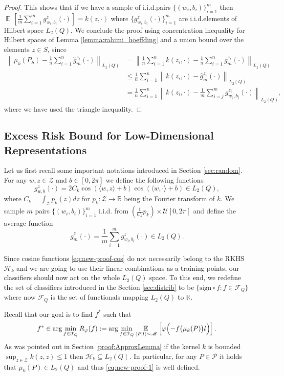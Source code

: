 \documentclass{article}
\DeclareMathOperator*{\E}{\mathbb{E}\,}
\renewcommand{\P}{\mathcal{P}}
\renewcommand{\H}{\mathcal{H}}
\newcommand{\U}{\mathcal{U}}
\newcommand{\F}{\mathcal{F}}
\newcommand{\M}{\mathscr{M}}
\newcommand{\Z}{\mathcal{Z}}
\newcommand{\sig}{\mathrm{sign}\circ\!}
\newcommand{\R}{\mathbb{R}}
\begin{document}
\begin{proof}
This shows that if we have a sample of i.i.d.\:pairs $\{(w_i,b_i)\}_{i=1}^m$
then $\E\left[\frac{1}{m}\sum_{i=1}^m g^z_{w_i,b_i}(\cdot)\right]= k(z,\cdot)$
where $\{g^z_{w_i,b_i}(\cdot)\}_{i=1}^m$ are i.i.d.\:elements of Hilbert space
$L_2(Q)$.  We conclude the proof using concentration inequality for Hilbert
spaces of Lemma \ref{lemma:rahimi_hoeffding} and a union bound over the
elements $z\in S$, since
\begin{align*}
\left\|\mu_k(P_S) - \frac{1}{n}\sum_{i=1}^n\hat{g}_m^{z_i}(\cdot)\right\|_{L_2(Q)}
&=
\left\|\frac{1}{n}\sum_{i=1}^nk(z_i,\cdot) - \frac{1}{n}\sum_{i=1}^n\hat{g}_m^{z_i}(\cdot)\right\|_{L_2(Q)}\\
&\leq
\frac{1}{n}\sum_{i=1}^n\left\|k(z_i,\cdot) - \hat{g}_m^{z_i}(\cdot)\right\|_{L_2(Q)}\\
&=
\frac{1}{n}\sum_{i=1}^n\left\|k(z_i,\cdot) - \frac{1}{m}\sum_{i=j}^m g^{z_i}_{w_j,b_j}(\cdot)\right\|_{L_2(Q)},
\end{align*}
where we have used the triangle inequality.
\end{proof}

\subsection{Excess Risk Bound for Low-Dimensional Representations}\label{sec:new-theorem}
Let us first recall some important notations introduced in Section \ref{sec:random}.
For any $w,z\in\Z$ and $b\in[0,2\pi]$ we define the following functions
\begin{equation}
\label{eq:new-proof-cos}
g_{w,b}^z (\cdot) = 2C_k\cos(\langle w,z\rangle + b)\cos(\langle w,\cdot\rangle + b) \in L_2(Q),
\end{equation}
where $C_k = \int_{\Z}p_k(z) dz$ for $p_k\colon \Z\to\R$ being the Fourier transform of $k$.
We sample $m$ pairs $\{(w_i,b_i)\}_{i=1}^m$ i.i.d. from $\left(\frac{1}{C_k}p_k\right)\times \U[0,2\pi]$ and define the average function
\[
\hat{g}_m^z(\cdot) = \frac{1}{m}\sum_{i=1}^m g_{w_i,b_i}^z(\cdot) \in L_2(Q).
\]

Since cosine functions \eqref{eq:new-proof-cos} do not necessarily belong to the RKHS $\H_k$ 
and we are going to use their linear combinations as a training points,
our classifiers should now act on the whole $L_2(Q)$ space.
To this end, we redefine the set of classifiers introduced in the Section \ref{sec:distrib} to 
be $\{\sig f\colon f\in\F_Q\}$ where now $\F_Q$ is the set of functionals mapping $L_2(Q)$ to $\R$.

Recall that our goal is to find $f^*$ such that
\begin{equation}
\label{eq:new-proof-1}
f^* \in \arg\min_{f\in \F_Q} R_{\varphi}(f):= \arg\min_{f\in \F_Q} \E_{(P,l)\sim \M}\left[\varphi\Bigl(-f\bigl(\mu_k(P)\bigr)l\Bigr)\right].
\end{equation}
As was pointed out in Section \ref{proof:ApproxLemma} if the kernel $k$ is bounded $\sup_{z\in\Z}k(z,z)\leq 1$ then $\H_k\subseteq L_2(Q)$.
In particular, for any $P\in\P$ it holds that $\mu_k(P)\in L_2(Q)$ and thus \eqref{eq:new-proof-1} is well defined.
\end{document}
